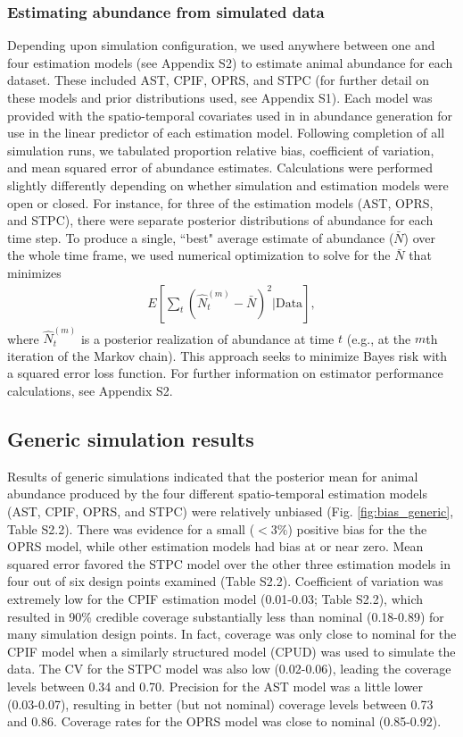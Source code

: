 \documentclass[12pt,english]{article}
\begin{document}
\begin{spacing}{1.9}
\subsubsection{Estimating abundance from simulated data}

Depending upon simulation configuration, we used anywhere between one and four estimation models (see Appendix S2) to estimate animal abundance for each dataset.  These included AST, CPIF, OPRS, and STPC (for further detail on these models and prior distributions used, see Appendix S1).  Each model was provided with the spatio-temporal covariates used in in abundance generation for use in the linear predictor of each estimation model.  Following completion of all simulation runs, we tabulated proportion relative bias, coefficient of variation, and mean squared error of abundance estimates.  Calculations were performed slightly differently depending on whether simulation and estimation models were open or closed.  For instance, for three of the estimation models (AST, OPRS, and STPC), there were separate posterior distributions of abundance for each time step.  To produce a single, ``best" average estimate of abundance ($\bar{N}$) over the whole time frame,
we used numerical optimization to solve for the $\bar{N}$ that minimizes
\begin{eqnarray*}
  E \left[ \sum_t (\hat{N}_t^{(m)} - \bar{N})^2 | \text{Data} \right],
\end{eqnarray*}
where $\hat{N}_t^{(m)}$ is a posterior realization of abundance at time $t$ (e.g., at the $m$th iteration of the Markov chain).  This approach seeks to minimize Bayes risk with a squared error loss function.  For further information on estimator performance calculations, see Appendix S2.

\subsection{Generic simulation results}

Results of generic simulations indicated that the posterior mean for animal abundance produced by the four different spatio-temporal estimation models (AST, CPIF, OPRS, and STPC) were relatively unbiased (Fig. \ref{fig:bias_generic}, Table S2.2).  There was evidence for a small ($<3\%$)  positive bias for the the OPRS model, while other estimation models had bias at or near zero.  Mean squared error favored the STPC model over the other three estimation models in four out of six design points examined (Table S2.2).  Coefficient of variation was extremely low for the CPIF estimation model (0.01-0.03; Table S2.2), which resulted in 90\% credible coverage substantially less than nominal (0.18-0.89) for many simulation design points.  In fact, coverage was only close to nominal for the CPIF model when a similarly structured model (CPUD) was used to simulate the data.  The CV for the STPC model was also low (0.02-0.06), leading the coverage levels between 0.34 and 0.70.  Precision for the AST model was a little lower (0.03-0.07), resulting in better (but not nominal) coverage levels between 0.73 and 0.86.  Coverage rates for the OPRS model was close to nominal (0.85-0.92).




\end{spacing}
\end{document}
